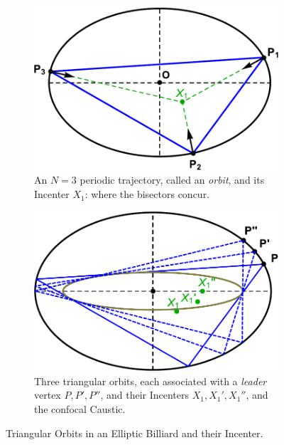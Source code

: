 \begin{figure}[H]
     \centering
     \begin{subfigure}[t]{0.45\textwidth}
         \centering
         \includegraphics[height=.65 \linewidth]{pics/0000_single_orbit.pdf}
         \caption{An $N=3$ periodic trajectory, called an {\em orbit}, and its Incenter $X_1$: where the bisectors concur.}
         \label{fig:single-orbit}
     \end{subfigure}
     \hfill
     \begin{subfigure}[t]{0.45\textwidth}
         \centering
          \includegraphics[height=.65\linewidth]{pics/0010_three_orbits.pdf}
         \caption{Three triangular orbits, each associated with a {\em leader} vertex $P,P',P''$, and their Incenters $X_1,X_1',X_1''$, and the confocal Caustic.}
         \label{fig:three-orbits}
     \end{subfigure}
     \caption{Triangular Orbits in an Elliptic Billiard and their Incenter.}
\end{figure}


